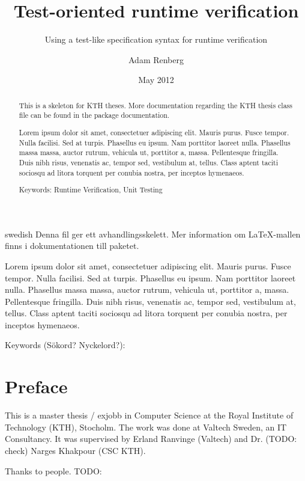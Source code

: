 \documentclass[a4paper,11pt]{kth-mag}
\title{Test-oriented runtime verification}
\subtitle{Using a test-like specification syntax for runtime verification}
\author{Adam Renberg}
\date{May 2012}
\begin{document}
\frontmatter
\pagestyle{empty}
\removepagenumbers
\maketitle

\begin{abstract}
  This is a skeleton for KTH theses. More documentation
  regarding the KTH thesis class file can be found in
  the package documentation.

Lorem ipsum dolor sit amet, consectetuer adipiscing elit. Mauris
purus. Fusce tempor. Nulla facilisi. Sed at turpis. Phasellus eu
ipsum. Nam porttitor laoreet nulla. Phasellus massa massa, auctor
rutrum, vehicula ut, porttitor a, massa. Pellentesque fringilla. Duis
nibh risus, venenatis ac, tempor sed, vestibulum at, tellus. Class
aptent taciti sociosqu ad litora torquent per conubia nostra, per
inceptos hymenaeos.

\bigskip\noindent
Keywords: Runtime Verification, Unit Testing
\end{abstract}
\clearpage

\begin{foreignabstract}{swedish}
  Denna fil ger ett avhandlingsskelett.
  Mer information om \LaTeX-mallen finns i
  dokumentationen till paketet.

Lorem ipsum dolor sit amet, consectetuer adipiscing elit. Mauris
purus. Fusce tempor. Nulla facilisi. Sed at turpis. Phasellus eu
ipsum. Nam porttitor laoreet nulla. Phasellus massa massa, auctor
rutrum, vehicula ut, porttitor a, massa. Pellentesque fringilla. Duis
nibh risus, venenatis ac, tempor sed, vestibulum at, tellus. Class
aptent taciti sociosqu ad litora torquent per conubia nostra, per
inceptos hymenaeos.

\bigskip\noindent
Keywords (Sökord? Nyckelord?): 
\end{foreignabstract}
\clearpage


\pagestyle{newchap}
\chapter*{Preface}

This is a master thesis / exjobb in Computer Science at the Royal Institute of Technology (KTH), Stocholm. The work was done at Valtech Sweden, an IT Consultancy. It was supervised by Erland Ranvinge (Valtech) and Dr. (TODO: check) Narges Khakpour (CSC KTH).

Thanks to people. TODO: 
\clearpage
\end{document}
